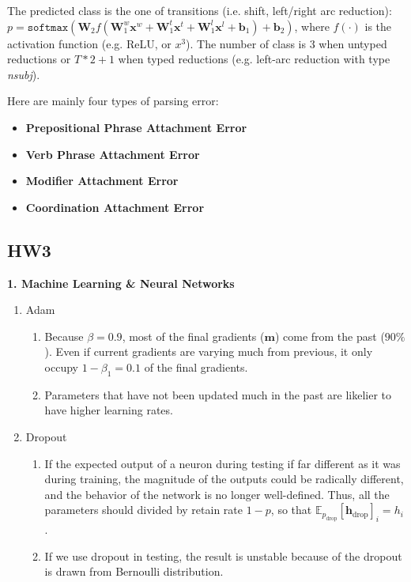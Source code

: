 
The predicted class is the one of transitions (i.e. shift, left/right arc reduction): $p = \texttt{softmax}(\bm{W}_2 f(\bm{W}_1^w \bm{x}^w + \bm{W}_1^t \bm{x}^t + \bm{W}_1^l \bm{x}^l + \bm{b}_1) + \bm{b}_2)$, where $f(\cdot)$ is the activation function (e.g. ReLU, or $x^3$).
The number of class is $3$ when untyped reductions or $T * 2 + 1$ when typed reductions (e.g. left-arc reduction with type \emph{nsubj}).

Here are mainly four types of parsing error:
\begin{itemize}
	\item \textbf{Prepositional Phrase Attachment Error}
	\item \textbf{Verb Phrase Attachment Error}
	\item \textbf{Modifier Attachment Error}
	\item \textbf{Coordination Attachment Error}
\end{itemize}

\subsection{HW3}
\textbf{1. Machine Learning \& Neural Networks}

\begin{enumerate}[label=(\alph*)]
	\item Adam
	\begin{enumerate}[label=(\roman*)]
		\item Because $\beta = 0.9$, most of the final gradients ($\bm{m}$) come from the past ($90\%$). Even if current gradients are varying much from previous, it only occupy $1 - \beta_1 = 0.1$ of the final gradients.
		\item Parameters that have not been updated much in the past are likelier to have higher learning rates.
	\end{enumerate}
	\item Dropout
	\begin{enumerate}[label=(\roman*)]
		\item If the expected output of a neuron during testing if far different as it was during training, the magnitude of the outputs could be radically different, and the behavior of the network is no longer well-defined. Thus, all the parameters should divided by retain rate $1-p$, so that $\mathbb{E}_{p_{\text{drop}}} [\bm{h}_{\text{drop}}]_i = h_i$.
		\item If we use dropout in testing, the result is unstable because of the dropout is drawn from Bernoulli distribution.
	\end{enumerate}
\end{enumerate}

